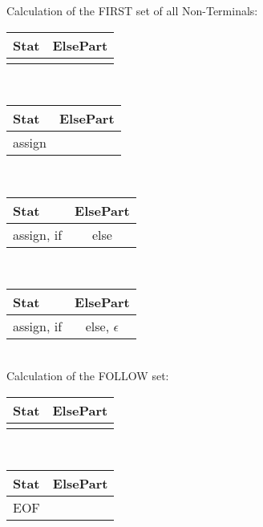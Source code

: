 \documentclass[11pt]{article} %
\begin{document}
\noindent Calculation of the FIRST set of all Non-Terminals:\\

\begin{tabular}{|p{2cm}|c|} \hline 
\textbf{Stat}
& \textbf{ElsePart} \\\hline 

& \\\hline 
\end{tabular} \\

\begin{tabular}{|p{2cm}|c|} \hline 
\textbf{Stat}
& \textbf{ElsePart} \\\hline 

assign
& \\\hline 
\end{tabular} \\

\begin{tabular}{|p{2cm}|c|} \hline 
\textbf{Stat}
& \textbf{ElsePart} \\\hline 

assign, if
& else \\\hline 
\end{tabular} \\

\begin{tabular}{|p{2cm}|c|} \hline 
\textbf{Stat}
& \textbf{ElsePart} \\\hline

assign, if
& else, $\epsilon$ \\\hline 
\end{tabular}\\

\noindent Calculation of the FOLLOW set:\\

\begin{tabular}{|p{2cm}|c|} \hline 
\textbf{Stat}
& \textbf{ElsePart} \\\hline 

& \\\hline 
\end{tabular} \\

\begin{tabular}{|p{2cm}|c|} \hline 
\textbf{Stat}
& \textbf{ElsePart} \\\hline

EOF
& \\\hline 
\end{tabular} \\
\end{document}
